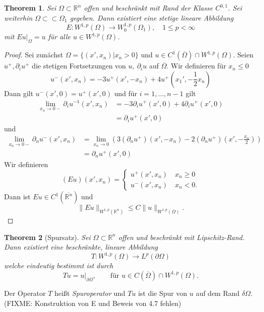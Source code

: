 \documentclass[
paper=a4,
bibtotocnumbered,
liststotocnumbered,
tablecaptionabove,
pointlessnumbers,
twoside,
openright,
10pt
]
{report}
\newtheorem{thm}{Theorem}[chapter]
\theoremstyle{definition}
\numberwithin{equation}{chapter}
\begin{document}
\begin{thm}\label{4.6}
 Sei $\Omega\subset \mathbb R^n$ offen und beschränkt mit Rand der Klasse $C^{0,1}$. Sei weiterhin $\Omega \subset \subset \Omega_1$ gegeben. Dann existiert eine stetige lineare Abbildung
 \begin{equation}
 E: W^{1,p}(\Omega) \to W_{0}^{1,p}(\Omega_1), \quad 1\le p <\infty
 \end{equation}
 mit $Eu\big|_\Omega=u$ für alle $u\in W^{1,p}(\Omega)$. 
\end{thm}
\begin{proof}
 Sei zunächst $\Omega=\{(x', x_n) |x_n >0\}$ und $u\in C^1(\overline{\Omega}) \cap W^{1,p}(\Omega)$. Seien $u^+, \partial_i u^+$ die stetigen Fortsetzungen von $u,\ \partial_i u$ auf $\overline{\Omega}$. Wir definieren für $x_n \le 0$
 \begin{equation}
  u^{-}(x', x_n) = - 3 u^+(x', -x_n) + 4u^+\left (x_1', - \frac{1}{2} x_n\right )
 \end{equation}
 Dann gilt $u^{-}(x',0)=u^+(x',0)$ und für
 $i=1, \ldots, n-1$ gilt
 \begin{align*}
  \lim_{x_n\to 0-} \partial_i  u^{-1}(x', x_n) &= - 3\partial_i u^{+}(x',0) + 4\partial_i u^+(x',0) \\
  &=\partial_i u^+ (x',0)
 \end{align*}
und 
\begin{align*}
 \lim_{x_n\to 0-} \partial_n u^{-} (x', x_n) &= \lim_{x_n\to 0} (3(\partial_n u^+) (x', -x_n) - 2(\partial_n u^+) (x', -\frac{x_n}{2}))\\
 &=\partial_n u^{+}(x',0)
\end{align*}
Wir definieren
\begin{equation}
 (Eu)(x', x_n) = \begin{cases}
                  u^{+}(x', x_n) \quad x_n \ge 0 \\
                  u^{-}(x', x_n) \quad x_n <0.
                 \end{cases}
\end{equation}
Dann ist $Eu\in C^1(\overline{\mathbb R^n})$ und 
\begin{equation}
 \| Eu\|_{W^{1,p}(\mathbb R^n)} \le C\|u\|_{W^{1,p}(\Omega)}.
\end{equation}
\end{proof}
\begin{thm}[Spursatz] \label{4.7}
Sei $\Omega \subset \mathbb R^n$ offen und beschränkt mit Lipschitz-Rand. Dann existiert eine beschränkte, lineare Abbildung
\begin{equation}
T: W^{1,p}(\Omega) \to L^p(\partial \Omega)
\end{equation}
welche eindeutig bestimmt ist durch
\begin{equation}
Tu = u\big|_{\partial \Omega}, \qquad \text{für } u\in C(\overline{\Omega}) \cap W^{1,p}(\Omega).
\end{equation}
\end{thm}
Der Operator $T$ heißt \emph{Spuroperator} und $Tu$ ist die Spur von $u$ auf dem Rand $\delta \Omega$.
(FIXME: Konstruktion von E und Beweis von 4.7 fehlen)
\end{document}
